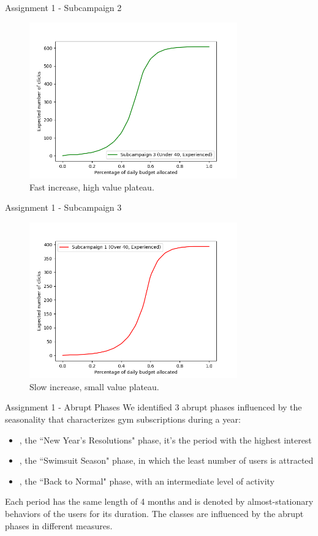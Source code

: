 \documentclass[11pt]{beamer}
\begin{document}
\begin{frame}{Assignment 1 - Subcampaign 2}
\begin{figure}[hbtp]
\centering
\includegraphics[width=0.8\textwidth]{images/subcampaign_3.png}
\caption{Fast increase, high value plateau.}
\end{figure}
\end{frame}

\begin{frame}{Assignment 1 - Subcampaign 3}
\begin{figure}[hbtp]
\centering
\includegraphics[width=0.8\textwidth]{images/subcampaign_1.png}
\caption{Slow increase, small value plateau.}
\end{figure}
\end{frame}

\begin{frame}{Assignment 1 - Abrupt Phases}
We identified 3 abrupt phases influenced by the seasonality that characterizes gym subscriptions during a year:
\begin{itemize}
\item [1.] [January-April], the ``New Year's Resolutions" phase, it's the period with the highest interest
\item [2.] [May-August], the ``Swimsuit Season" phase, in which the least number of users is attracted
\item [3.] [September-December], the ``Back to Normal" phase, with an intermediate level of activity 
\end{itemize}
Each period has the same length of 4 months and is denoted by almost-stationary behaviors of the users for its duration. The classes are influenced by the abrupt phases in different measures.
\end{frame} 
\end{document}
